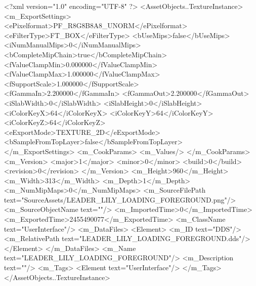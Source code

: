 <?xml version="1.0" encoding="UTF-8" ?>
<AssetObjects..TextureInstance>
	<m_ExportSettings>
		<ePixelformat>PF_R8G8B8A8_UNORM</ePixelformat>
		<eFilterType>FT_BOX</eFilterType>
		<bUseMips>false</bUseMips>
		<iNumManualMips>0</iNumManualMips>
		<bCompleteMipChain>true</bCompleteMipChain>
		<fValueClampMin>0.000000</fValueClampMin>
		<fValueClampMax>1.000000</fValueClampMax>
		<fSupportScale>1.000000</fSupportScale>
		<fGammaIn>2.200000</fGammaIn>
		<fGammaOut>2.200000</fGammaOut>
		<iSlabWidth>0</iSlabWidth>
		<iSlabHeight>0</iSlabHeight>
		<iColorKeyX>64</iColorKeyX>
		<iColorKeyY>64</iColorKeyY>
		<iColorKeyZ>64</iColorKeyZ>
		<eExportMode>TEXTURE_2D</eExportMode>
		<bSampleFromTopLayer>false</bSampleFromTopLayer>
	</m_ExportSettings>
	<m_CookParams>
		<m_Values/>
	</m_CookParams>
	<m_Version>
		<major>1</major>
		<minor>0</minor>
		<build>0</build>
		<revision>0</revision>
	</m_Version>
	<m_Height>960</m_Height>
	<m_Width>313</m_Width>
	<m_Depth>1</m_Depth>
	<m_NumMipMaps>0</m_NumMipMaps>
	<m_SourceFilePath text="SourceAssets/LEADER_LILY_LOADING_FOREGROUND.png"/>
	<m_SourceObjectName text=""/>
	<m_ImportedTime>0</m_ImportedTime>
	<m_ExportedTime>2455490077</m_ExportedTime>
	<m_ClassName text="UserInterface"/>
	<m_DataFiles>
		<Element>
			<m_ID text="DDS"/>
			<m_RelativePath text="LEADER_LILY_LOADING_FOREGROUND.dds"/>
		</Element>
	</m_DataFiles>
	<m_Name text="LEADER_LILY_LOADING_FOREGROUND"/>
	<m_Description text=""/>
	<m_Tags>
		<Element text="UserInterface"/>
	</m_Tags>
</AssetObjects..TextureInstance>

